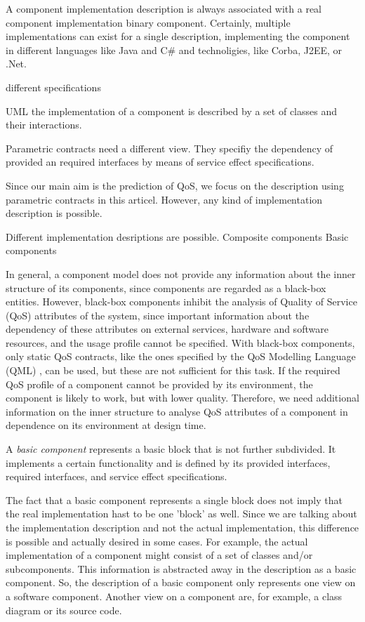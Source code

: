 A component implementation description is always associated with a real
component implementation binary component. Certainly, multiple implementations
can exist for a single description, implementing the component in different
languages like Java and C\# and technoligies, like Corba, J2EE, or .Net.

different specifications

UML the implementation of a component is described by a set of classes and
their interactions. 

Parametric contracts need a different view. They specifiy the dependency of
provided an required interfaces by means of service effect specifications.

Since our main aim is the prediction of QoS, we focus on the description using
parametric contracts in this articel. However, any kind of implementation
description is possible.

Different implementation desriptions are possible.
Composite components
Basic components

In general, a component model does not provide any information about the inner
structure of its components, since components are regarded as a black-box
entities. However, black-box components inhibit the analysis of Quality of
Service (QoS) attributes of the system, since important information about the
dependency of these attributes on external services, hardware and software
resources, and the usage profile cannot be specified.  With black-box
components, only static QoS contracts, like the ones specified by the QoS
Modelling Language (QML) \cite{frolund1998a}, can be used, but these are not
sufficient for this task. If the required QoS profile of a component cannot be
provided by its environment, the component is likely to work, but with lower
quality. Therefore, we need additional information on the inner
structure to analyse QoS attributes of a component in dependence on its
environment at design time.

A \emph{basic component} represents a basic block that is not further
subdivided. It implements a certain functionality and is defined by its provided
interfaces, required interfaces, and service effect specifications.


The fact that a basic component represents a single block does not imply that
the real implementation hast to be one 'block' as well. Since we are talking
about the implementation description and not the actual implementation, this
difference is possible and actually desired in some cases. For example, the
actual implementation of a component might consist of a set of classes and/or
subcomponents. This information is abstracted away in the description as a basic
component. So, the description of a basic component only represents one view on
a software component. Another view on a component are, for example, a class
diagram or its source code.

